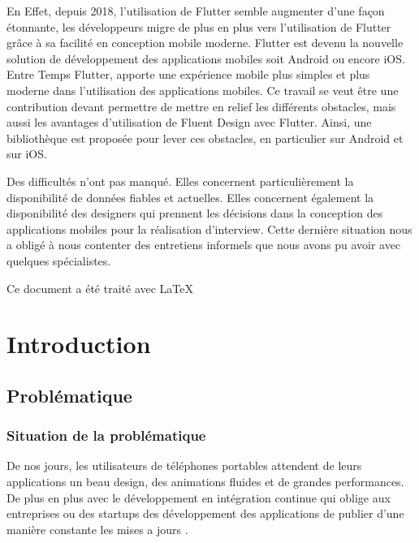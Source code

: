 \documentclass[a4paper,12pt]{report}
\begin{document}
    
    En Effet, depuis 2018, l'utilisation de Flutter semble augmenter d'une façon étonnante, les développeurs migre de plus en plus vers l'utilisation de Flutter grâce à sa facilité en conception mobile moderne. 
    Flutter est devenu la nouvelle solution de développement des applications mobiles soit Android ou encore iOS. Entre Temps Flutter, apporte une expérience mobile plus simples et plus moderne dans l'utilisation des applications mobiles.
    Ce travail se veut être une contribution devant permettre de mettre en relief les différents obstacles, mais aussi les avantages d'utilisation de Fluent Design avec Flutter. Ainsi, une bibliothèque est proposée pour lever ces obstacles, en particulier sur Android et sur iOS.
    
    
    Des difficultés n’ont pas manqué. Elles concernent particulièrement la disponibilité de données fiables et actuelles. Elles concernent également la disponibilité des designers qui prennent les décisions dans la conception des applications mobiles pour la réalisation d’interview. Cette dernière situation nous a obligé à nous contenter des entretiens informels que nous avons pu avoir avec quelques spécialistes.

    \vspace{20px}
    \begin{flushright}
        Ce document a été traité avec \LaTeX
    \end{flushright}
    
    \chapter*{Introduction}

        \section*{Problématique}

            \subsection*{Situation de la problématique}

                De nos jours, les utilisateurs de téléphones portables attendent de leurs applications un beau design, 
                des animations fluides et de grandes performances. 
                De plus en plus avec le développement en intégration continue qui oblige aux entreprises ou des 
                startups des développement des applications de publier d’une manière constante les mises a jours .
\end{document}
